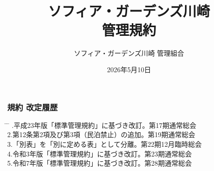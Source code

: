 \documentclass[
  luatex,
  paper=a4paper,
  fontsize=11pt,
  jafontsize=11pt,
  jlreq_notes,
]{jlreq}
\renewcommand{\baselinestretch}{0.9}
\begin{document}
  \pagestyle{empty} %
  \title{ソフィア・ガーデンズ川崎\\管理規約}
  \date{2026年5月10日}
  \maketitle
  \thispagestyle{empty}
  \vfill      %

  \begin{center}
    \vspace*{3\baselineskip}
    \author{\Large ソフィア・ガーデンズ川崎 管理組合}
  \end{center}
  \vspace*{2\baselineskip}
  { \renewcommand{\baselinestretch}{0.8}\selectfont   %
    \subsubsection*{ 規約 改定履歴 }
    \small
    \vspace*{1\baselineskip}
    \begin{tabbing}
      \hspace{5mm} \= \hspace{90mm} \= \hspace{100mm} .\>平成23年版「標準管理規約」に基づき改訂。\>第17期通常総会\\
      2.\>第12条第2項及び第3項（民泊禁止）の追加。\>第19期通常総会\\
      3.\>「別表」を「別に定める表」として分離。\>第22期12月臨時総会\\
      4.\>令和3年版「標準管理規約」に基づき改訂。\>第23期通常総会\\
      5.\>令和7年版「標準管理規約」に基づき改訂。\>第28期通常総会\\
    \end{tabbing}
  }
  \clearpage

  { \renewcommand{\baselinestretch}{0.8}\selectfont
    \tableofcontents        %
  }
  \clearpage

  \setcounter{page}{1}    %
  \pagestyle{plain}       %
\end{document}
